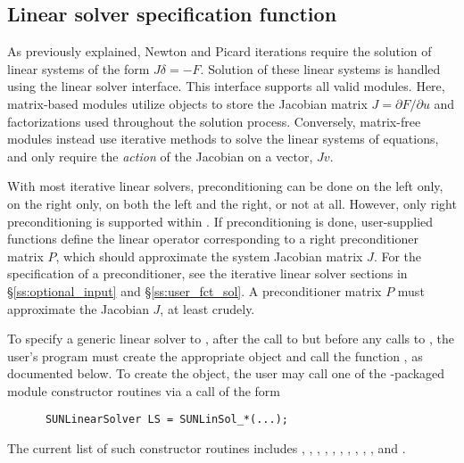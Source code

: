 
\subsection{Linear solver specification function}\label{sss:lin_solv_init}

As previously explained, Newton and Picard iterations require the solution of
linear systems of the form $J\delta = -F$. Solution of these linear
systems is handled using the {\kinls} linear solver interface.  This
interface supports all valid {\sunlinsol} modules.  Here, matrix-based
{\sunlinsol} modules utilize {\sunmatrix} objects to store the
Jacobian matrix $J = \partial{F}/\partial{u}$ and factorizations used
throughout the solution process.  Conversely, matrix-free {\sunlinsol}
modules instead use iterative methods to solve the linear systems of
equations, and only require the \emph{action} of the Jacobian on a
vector, $Jv$.

With most iterative linear solvers, preconditioning can be done on the
left only, on the right only, on both the left and the right, or not
at all.  However, only right preconditioning is supported within
{\kinls}.  If preconditioning is done, user-supplied
functions define the linear operator corresponding to a right
preconditioner matrix $P$, which should approximate the system
Jacobian matrix $J$.  For the specification of a preconditioner, see
the iterative linear solver sections in \S\ref{ss:optional_input} and
\S\ref{ss:user_fct_sol}. A preconditioner matrix $P$ must approximate
the Jacobian $J$, at least crudely.

To specify a generic linear solver to {\kinsol}, after the call to
 but before any calls to , the user's
program must create the appropriate {\sunlinsol} object and call
the function , as documented below.
To create the  object, the user may call one of
the {\sundials}-packaged {\sunlinsol} module constructor routines via
a call of the form

\begin{verbatim}
      SUNLinearSolver LS = SUNLinSol_*(...);
\end{verbatim}

The current list of such constructor routines includes
,
,
,
,
,
,
,
,
,
, and
.

